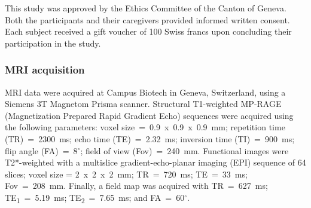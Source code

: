 This study was approved by the Ethics Committee of the Canton of Geneva. Both the participants and their caregivers provided informed written consent. Each subject received a gift voucher of 100 Swiss francs upon concluding their participation in the study. 

\subsubsection{MRI acquisition}

MRI data were acquired at Campus Biotech in Geneva, Switzerland, using a Siemens 3T Magnetom Prisma scanner. Structural T1-weighted MP-RAGE (Magnetization Prepared Rapid Gradient Echo) sequences were acquired using the following parameters: voxel size~=~0.9~x~0.9~x~0.9~mm; repetition time (TR)~=~2300~ms; echo time (TE)~=~2.32~ms; inversion time (TI)~=~900~ms; flip angle (FA)~=~8$^{\circ}$; field of view (Fov)~=~240~mm. Functional images were T2*-weighted with a multislice gradient-echo-planar imaging (EPI) sequence of 64 slices; voxel size = 2~x~2~x~2~mm; TR~=~720~ms; TE~=~33~ms; Fov~=~208~mm. Finally, a field map was acquired with TR~=~627~ms; TE\textsubscript{1}~=~5.19~ms; TE\textsubscript{2}~=~7.65~ms; and FA~=~60$^{\circ}$.

